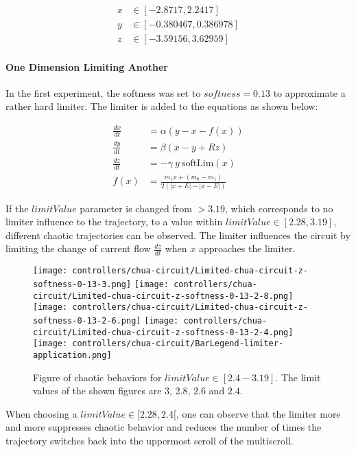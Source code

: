 \documentclass[main]{subfiles}
\begin{document}
\begin{align*}
x &\in [-2.8717,2.2417]\\
y &\in [-0.380467,0.386978]\\
z &\in [-3.59156,3.62959]
\end{align*}

\paragraph{One Dimension Limiting Another}

In the first experiment, the softness was set to \(softness=0.13\) to approximate a rather hard limiter. The limiter is added to the equations as shown below:

\begin{align*}
\frac{dx}{dt}&=\alpha (y-x-f(x)) \\
\frac{dy}{dt}&=\beta (x-y + Rz)\\
\frac{dz}{dt}&=-\gamma ~ y ~ \text{softLim}(x)\\
f (x) &= \frac{m_1 x + (m_0 - m_1)}{2 (| x + E | -| x - E |)}
\end{align*}

If the $limitValue$ parameter is changed from \(>3.19\), which corresponds to no limiter influence to the trajectory, to a value within \(limitValue \in [2.28,3.19]\), different chaotic trajectories can be observed. %
%
The limiter influences the circuit by limiting the change of current flow \(\frac{dz}{dt}\) when \(x\) approaches the limiter.

\begin{figure}[H]
\centering
\texttt{[image: controllers/chua-circuit/Limited-chua-circuit-z-softness-0-13-3.png]}
\texttt{[image: controllers/chua-circuit/Limited-chua-circuit-z-softness-0-13-2-8.png]}
\texttt{[image: controllers/chua-circuit/Limited-chua-circuit-z-softness-0-13-2-6.png]}
\texttt{[image: controllers/chua-circuit/Limited-chua-circuit-z-softness-0-13-2-4.png]}
\texttt{[image: controllers/chua-circuit/BarLegend-limiter-application.png]}
\caption[Figure of chaotic behaviors for limitValue in 2.4-3.19]{Figure of chaotic behaviors  for \(limitValue \in [2.4-3.19]\). The limit values of the shown figures are \(3\), \(2.8\), \(2.6\) and \(2.4\).}
\label{figure:z-2.4-3.19-chaotictrajectories}
\end{figure}

When choosing a \(limitValue \in [2.28,2.4[\), one can observe that the limiter more and more suppresses chaotic behavior and reduces the number of times the trajectory switches back into the uppermost scroll of the multiscroll.
\end{document}
